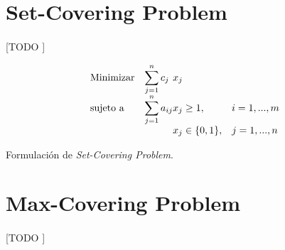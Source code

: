 \documentclass[spanish]{article}
\begin{document}
	\maketitle %

	\thispagestyle{fancy} %



	\begin{abstract}
		\noindent [TODO ]
	\end{abstract}

	\setcounter{section}{5}


	\section{Set-Covering Problem}
	\label{sec:e-6}

		\paragraph{}
		[TODO ]

		\begin{eqfloat}
			\begin{equation}
				\begin{array}{ll@{}ll}
					\text{Minimizar}	& \displaystyle\sum\limits_{j=1}^{n} c_{j}	&	x_{j} &\\
					\text{sujeto a}		& \displaystyle\sum\limits_{j = 1}^n a_{ij}	&	x_{j} \geq 1,  &i=1 ,..., m\\
														&                                           &	x_{j} \in \{0,1\}, &j=1 ,..., n
				\end{array}
			\end{equation}
			\caption{Formulación de \emph{Set-Covering Problem}.}
			\label{eq:set_covering}
		\end{eqfloat}



	\section{Max-Covering Problem}
	\label{sec:e-7}

		\paragraph{}
		[TODO ]
\end{document}
